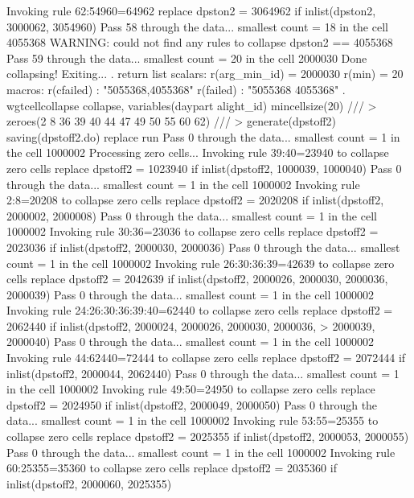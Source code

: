   Invoking rule 62:54960=64962
  replace dpston2 = 3064962 if inlist(dpston2, 3000062, 3054960)
Pass 58 through the data...
  smallest count = 18 in the cell      4055368
  WARNING: could not find any rules to collapse dpston2 == 4055368
Pass 59 through the data...
  smallest count = 20 in the cell      2000030
  Done collapsing! Exiting...
{\smallskip}
. return list
{\smallskip}
scalars:
         r(arg_min_id) =  2000030
                r(min) =  20
{\smallskip}
macros:
            r(cfailed) : "5055368,4055368"
             r(failed) : "5055368 4055368"
{\smallskip}
. wgtcellcollapse collapse, variables(daypart alight_id) mincellsize(20) ///
>         zeroes(2 8 36 39 40 44 47 49 50 55 60 62) ///
>         generate(dpstoff2) saving(dpstoff2.do) replace run
Pass 0 through the data...
  smallest count = 1 in the cell      1000002
{\smallskip}
Processing zero cells...
{\smallskip}
  Invoking rule 39:40=23940 to collapse zero cells
  replace dpstoff2 = 1023940 if inlist(dpstoff2, 1000039, 1000040)
Pass 0 through the data...
  smallest count = 1 in the cell      1000002
  Invoking rule 2:8=20208 to collapse zero cells
  replace dpstoff2 = 2020208 if inlist(dpstoff2, 2000002, 2000008)
Pass 0 through the data...
  smallest count = 1 in the cell      1000002
  Invoking rule 30:36=23036 to collapse zero cells
  replace dpstoff2 = 2023036 if inlist(dpstoff2, 2000030, 2000036)
Pass 0 through the data...
  smallest count = 1 in the cell      1000002
  Invoking rule 26:30:36:39=42639 to collapse zero cells
  replace dpstoff2 = 2042639 if inlist(dpstoff2, 2000026, 2000030, 2000036, 2000039)
Pass 0 through the data...
  smallest count = 1 in the cell      1000002
  Invoking rule 24:26:30:36:39:40=62440 to collapse zero cells
  replace dpstoff2 = 2062440 if inlist(dpstoff2, 2000024, 2000026, 2000030, 2000036,
>  2000039, 2000040)
Pass 0 through the data...
  smallest count = 1 in the cell      1000002
  Invoking rule 44:62440=72444 to collapse zero cells
  replace dpstoff2 = 2072444 if inlist(dpstoff2, 2000044, 2062440)
Pass 0 through the data...
  smallest count = 1 in the cell      1000002
  Invoking rule 49:50=24950 to collapse zero cells
  replace dpstoff2 = 2024950 if inlist(dpstoff2, 2000049, 2000050)
Pass 0 through the data...
  smallest count = 1 in the cell      1000002
  Invoking rule 53:55=25355 to collapse zero cells
  replace dpstoff2 = 2025355 if inlist(dpstoff2, 2000053, 2000055)
Pass 0 through the data...
  smallest count = 1 in the cell      1000002
  Invoking rule 60:25355=35360 to collapse zero cells
  replace dpstoff2 = 2035360 if inlist(dpstoff2, 2000060, 2025355)
